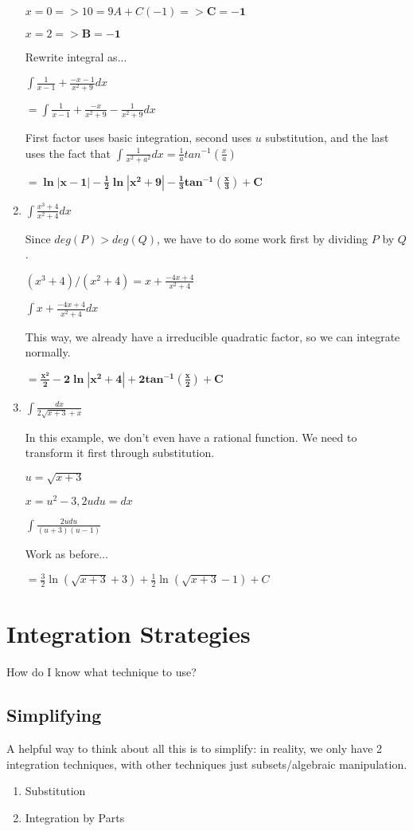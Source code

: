 \documentclass{article}
\begin{document}
\begin{enumerate}
    $x=0 => 10 = 9A + C(-1) => \mathbf{C=-1}$
    
    $x=2 => \mathbf{B = -1}$
    
    Rewrite integral as...
    
    $\int \frac{1}{x-1} + \frac{-x-1}{x^2+9} dx$
    
    $= \int \frac{1}{x-1} + \frac{-x}{x^2+9} - \frac{1}{x^2+9} dx$
    
    First factor uses basic integration, second uses $u$ substitution, and the last uses the fact that $\int \frac{1}{x^2+a^2} dx= \frac{1}{a}tan^{-1}(\frac{x}{a})$
    
    $= \mathbf{\ln |x-1| - \frac{1}{2} \ln |x^2+9| - \frac{1}{3}tan^{-1}(\frac{x}{3}) + C}$
    
    \item $\int \frac{x^3+4}{x^2+4} dx$
    
    Since $deg(P) > deg(Q)$, we have to do some work first by dividing $P$ by $Q$.
    
    $(x^3+4)/(x^2+4) = x + \frac{-4x+4}{x^2+4}$
    
    $\int x + \frac{-4x+4}{x^2+4} dx$
    
    This way, we already have a irreducible quadratic factor, so we can integrate normally.
    
    $ = \mathbf{\frac{x^2}{2} -2\ln |x^2+4|+2tan^{-1}(\frac{x}{2}) + C}$
    
    \item $\int \frac{dx}{2\sqrt{x+3}+x}$
    
    In this example, we don't even have a rational function. We need to transform it first through substitution.
    
    $u = \sqrt{x+3}$
    
    $x = u^2-3, 2udu = dx$
    
    $\int \frac{2u du}{(u+3)(u-1)} $
    
    Work as before...
    
    $= \frac{3}{2}\ln(\sqrt{x+3}+3) + \frac{1}{2}\ln(\sqrt{x+3}-1) + C$
\end{enumerate}

\section{Integration Strategies}
How do I know what technique to use?

\subsection{Simplifying}
A helpful way to think about all this is to simplify: in reality, we only have 2 integration techniques, with other techniques just subsets/algebraic manipulation.
\begin{enumerate}
    \item Substitution
    
    \item Integration by Parts
\end{enumerate}
\end{document}
